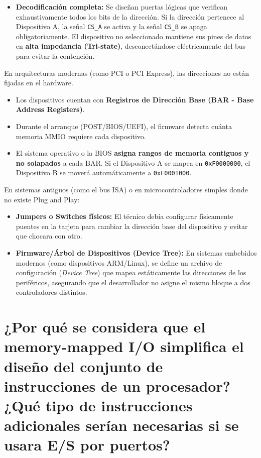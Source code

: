 \documentclass{article}
\begin{document}
\begin{itemize}
    \item \textbf{Decodificación completa:} Se diseñan puertas lógicas que verifican exhaustivamente todos los bits de la dirección. Si la dirección pertenece al Dispositivo A, la señal \verb|CS_A| se activa y la señal \verb|CS_B| se apaga obligatoriamente. El dispositivo no seleccionado mantiene sus pines de datos en \textbf{alta impedancia (Tri-state)}, desconectándose eléctricamente del bus para evitar la contención.
 \end{itemize}
 
En arquitecturas modernas (como PCI o PCI Express), las direcciones no están fijadas en el hardware.

\begin{itemize}
        \item Los dispositivos cuentan con \textbf{Registros de Dirección Base (BAR - Base Address Registers)}.
        \item Durante el arranque (POST/BIOS/UEFI), el firmware detecta cuánta memoria MMIO requiere cada dispositivo.
        \item El sistema operativo o la BIOS \textbf{asigna rangos de memoria contiguos y no solapados} a cada BAR. Si el Dispositivo A se mapea en \verb|0xF0000000|, el Dispositivo B se moverá automáticamente a \verb|0xF0001000|.
\end{itemize}

 En sistemas antiguos (como el bus ISA) o en microcontroladores simples donde no existe Plug and Play:

\begin{itemize}
        \item \textbf{Jumpers o Switches físicos:} El técnico debía configurar físicamente puentes en la tarjeta para cambiar la dirección base del dispositivo y evitar que chocara con otro.
        \item \textbf{Firmware/Árbol de Dispositivos (Device Tree):} En sistemas embebidos modernos (como dispositivos ARM/Linux), se define un archivo de configuración (\textit{Device Tree}) que mapea estáticamente las direcciones de los periféricos, asegurando que el desarrollador no asigne el mismo bloque a dos controladores distintos.
\end{itemize}

\section{¿Por qué se considera que el memory-mapped I/O simplifica el diseño del conjunto de 
instrucciones de un procesador? ¿Qué tipo de instrucciones adicionales serían necesarias 
si se usara E/S por puertos?}
\end{document}
